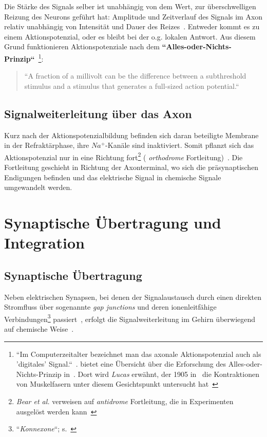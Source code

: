 {{Die Stärke des Signals selber ist unabhängig von dem Wert, zur überschwelligen Reizung des Neurons geführt hat: Amplitude und Zeitverlauf des Signals im Axon relativ unabhängig von Intensität und Dauer des Reizes~\cite[75]{Jon19}. Entweder kommt es zu einem Aktionspotenzial, oder es bleibt bei der o.g. lokalen Antwort. Aus diesem Grund funktionieren Aktionspotenziale nach dem \textbf{``Alles-oder-Nichts-Prinzip``}~\cite[89]{BCP18}\footnote{
 ``Im Computerzeitalter bezeichnet man das axonale Aktionspotenzial auch als 'digitales' Signal.``~\cite[75]{Jon19}.  bietet eine Übersicht über die Erforschung des Alles-oder-Nichts-Prinzip in~\cite{Fra94}. Dort wird \textit{Lucas} erwähnt, der 1905 in~\cite{Luc05} die Kontraktionen von Muskelfasern unter diesem Gesichtspunkt untersucht hat~\cite[210]{Fra94}
}:

\blockquote[{\cite[157]{KSJ+13}}]{
 ``A fraction of a millivolt can be the difference between a subthreshold stimulus and a stimulus that generates a full-sized action potential.``
}

\subsection{Signalweiterleitung über das Axon}

Kurz nach der Aktionspotenzialbildung befinden sich daran beteiligte Membrane in der Refraktärphase, ihre $Na^+$-Kanäle sind inaktiviert. 
Somit pflanzt sich das Aktionspotenzial nur in eine Richtung fort\footnote{
  \textit{Bear et al.} verweisen auf \textit{antidrome} Fortleitung, die in Experimenten ausgelöst werden kann~\cite[106]{BCP18}
} ( \textit{orthodrome} Fortleitung)~\cite[106]{BCP18}.
Die Fortleitung geschieht in Richtung der Axonterminal, wo sich die präsynaptischen Endigungen befinden und das elektrische Signal in chemische Signale umgewandelt werden.


\section{Synaptische Übertragung und Integration}


\subsection{Synaptische Übertragung}\label{synaptischeuebertragung}
Neben elektrischen Synapsen, bei denen der Signalaustausch durch einen direkten Stromfluss über sogenannte \textit{gap junctions} und deren ionenleitfähige Verbindungen\footnote{
 ``\textit{Konnexone}``; s.~\cite[50]{SD07}
} passiert~\cite[119]{BCP18}, erfolgt die Signalweiterleitung im Gehirn überwiegend auf chemische Weise~\cite[121 ff.]{BCP18}.

}}
